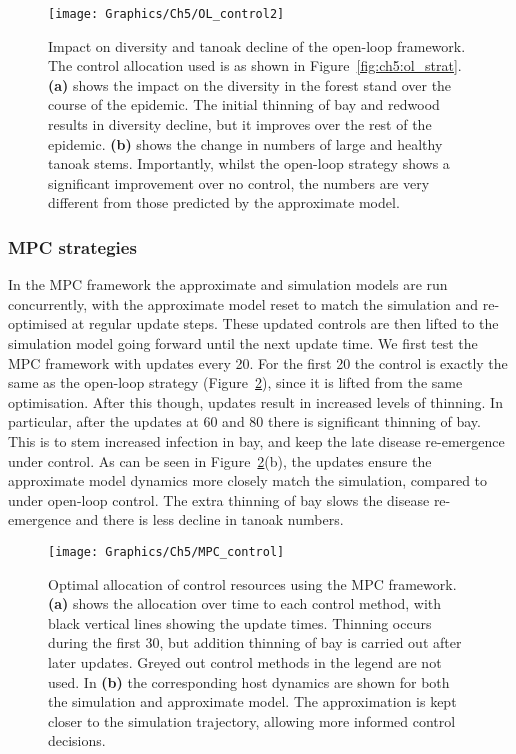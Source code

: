 \begin{figure}[t]
    \begin{center}
        \texttt{[image: Graphics/Ch5/OL\_control2]}
        \caption[Open-loop strategy diversity and tanoak decline]{Impact on diversity and tanoak decline of the open-loop framework. The control allocation used is as shown in Figure~\ref{fig:ch5:ol_strat}. \textbf{(a)} shows the impact on the diversity in the forest stand over the course of the epidemic. The initial thinning of bay and redwood results in diversity decline, but it improves over the rest of the epidemic. \textbf{(b)} shows the change in numbers of large and healthy tanoak stems. Importantly, whilst the open-loop strategy shows a significant improvement over no control, the numbers are very different from those predicted by the approximate model.\label{fig:ch5:ol_div_tan}}
    \end{center}
\end{figure}

\subsubsection{MPC strategies}

In the MPC framework the approximate and simulation models are run concurrently, with the approximate model reset to match the simulation and re-optimised at regular update steps. These updated controls are then lifted to the simulation model going forward until the next update time. We first test the MPC framework with updates every \SI{20}{\years}. For the first \SI{20}{\years} the control is exactly the same as the open-loop strategy (Figure~\ref{fig:ch5:mpc_strat}), since it is lifted from the same optimisation. After this though, updates result in increased levels of thinning. In particular, after the updates at 60 and \SI{80}{\years} there is significant thinning of bay. This is to stem increased infection in bay, and keep the late disease re-emergence under control. As can be seen in Figure~\ref{fig:ch5:mpc_strat}(b), the updates ensure the approximate model dynamics more closely match the simulation, compared to under open-loop control. The extra thinning of bay slows the disease re-emergence and there is less decline in tanoak numbers.

\begin{figure}[!t]
    \begin{center}
        \texttt{[image: Graphics/Ch5/MPC\_control]}
        \caption[MPC control strategy]{Optimal allocation of control resources using the MPC framework. \textbf{(a)} shows the allocation over time to each control method, with black vertical lines showing the update times. Thinning occurs during the first \SI{30}{\years}, but addition thinning of bay is carried out after later updates. Greyed out control methods in the legend are not used. In \textbf{(b)} the corresponding host dynamics are shown for both the simulation and approximate model. The approximation is kept closer to the simulation trajectory, allowing more informed control decisions.\label{fig:ch5:mpc_strat}}
    \end{center}
\end{figure}


